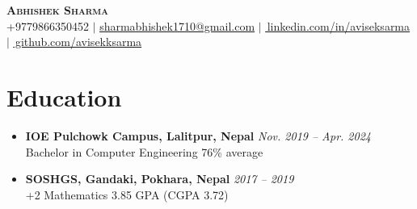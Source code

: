 \documentclass[letterpaper,11pt]{article}
\makeatletter
\newcommand{\resumeSubheading}[4]{
  \vspace{-2pt}\item
    \begin{tabular*}{0.97\textwidth}[t]{l@{\extracolsep{\fill}}r}
      \textbf{#1} & #2 \\
      \textit{\small#3} & \textit{\small #4} \\
    \end{tabular*}\vspace{-7pt}
}
\newcommand{\resumeSubHeadingListStart}{\begin{itemize}[leftmargin=0.15in, label={}]}
\newcommand{\resumeSubHeadingListEnd}{\end{itemize}}
\makeatother
\begin{document}

\begin{center}
    \textbf{\Huge \scshape Abhishek Sharma} \\ \vspace{6pt}
    \small +9779866350452 $|$ \href{mailto:sharmabhishek1710@gmail.com}{\underline{sharmabhishek1710@gmail.com}} $|$ 
    \href{https://www.linkedin.com/in/aviseksarma/}{\underline{\faLinkedinSquare \,linkedin.com/in/aviseksarma}} $|$
    \href{https://github.com/avisekksarma}{\underline{\faGithub\,github.com/avisekksarma}}
    
\end{center}

\section{Education}
\begin{itemize}
    \item \textbf{IOE Pulchowk Campus, Lalitpur, Nepal} \hfill \textit{Nov. 2019 -- Apr. 2024} \\
    Bachelor in Computer Engineering \hfill 76\% average
    \item \textbf{SOSHGS, Gandaki, Pokhara, Nepal} \hfill \textit{2017 -- 2019} \\
    +2 Mathematics \hfill 3.85 GPA (CGPA 3.72)
\end{itemize}



\end{document}
